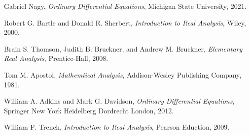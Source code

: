 \documentclass{arabicClass}
\begin{document}
	\abovedisplayskip=7pt
	\belowdisplayskip=7pt
	
	
	
	
	\tableofcontents
	\clearpage
	
	
	
	
		
	
	\begin{thebibliography}{99}
	
	\begin{english}
		Gabriel Nagy, \emph{Ordinary Differential Equations}, Michigan State University, 2021.

        Robert G. Bartle and Donald R. Sherbert, \emph{Introduction to Real Analysis}, Wiley, 2000.		
		
		Brain S. Thomson, Judith B. Bruckner, and Andrew M. Bruckner, \emph{Elementary Real Analysis}, Prentice-Hall, 2008.
		
		Tom M. Apostol, \emph{Mathemtical Analysis}, Addison-Wesley Publishing Company, 1981.
		
		William A. Adkins and Mark G. Davidson, \emph{Ordinary Differential Equations}, Springer New York Heidelberg Dordrecht London, 2012.
		
		William F. Trench, \emph{Introduction to Real Analysis}, Pearson Eduction, 2009.
		
		
		
			\end{english}
	\end{thebibliography}
\end{document}
